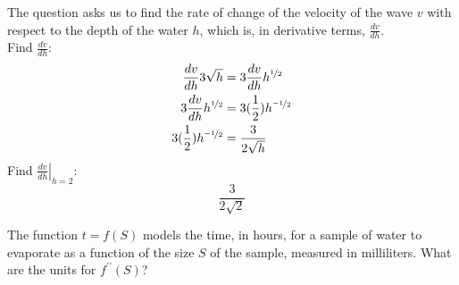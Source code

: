 \documentclass[12pt,letterpaper, onecolumn]{exam}
\newcommand\at[2]{\left.#1\right|_{#2}}
\begin{document}
\begin{questions}

	\begin{solution}
		The  question asks us to find the rate of change of the velocity of the wave $v$ with respect to the depth of the water $h$, which is, in derivative terms, $\frac{dv}{dh}$. \\
		Find $\frac{dv}{dh}$:
		\begin{align*}
			\frac{dv}{dh} 3\sqrt{h} & = 3 \frac{dv}{dh} h^{\nicefrac{1}{2}} \\
			3 \frac{dv}{dh} h^{\nicefrac{1}{2}} & = 3 (\frac{1}{2}) h^{\nicefrac{-1}{2}} \\
			3 (\frac{1}{2}) h^{\nicefrac{-1}{2}} & = \frac{3}{2\sqrt{h}}
		\end{align*}
		Find $\at{\frac{dv}{dh}}{h=2}$:
			$$\boxed{\frac{3}{2\sqrt{2}}}$$
	\end{solution}

\question The function $t=f(S)$ models the time, in hours, for a sample of water to evaporate as a function of the size $S$ of the sample, measured in milliliters. What are the units for $f^{\prime\prime}(S)$?
\end{questions}
\end{document}
